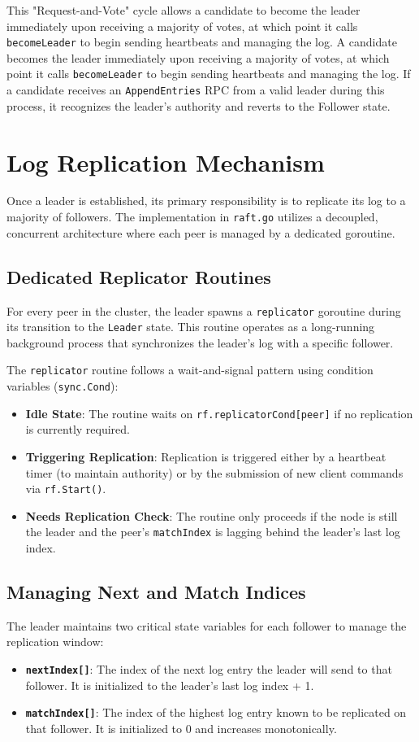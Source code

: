 This "Request-and-Vote" cycle allows a candidate to become the leader immediately upon receiving a majority of votes, at which point it calls \texttt{becomeLeader} to begin sending heartbeats and managing the log. A candidate becomes the leader immediately upon receiving a majority of votes, at which point it calls \texttt{becomeLeader} to begin sending heartbeats and managing the log. If a candidate receives an \texttt{AppendEntries} RPC from a valid leader during this process, it recognizes the leader's authority and reverts to the Follower state.

\section{Log Replication Mechanism}
\label{sec:log_replication_impl}
Once a leader is established, its primary responsibility is to replicate its log to a majority of followers. The implementation in \texttt{raft.go} utilizes a decoupled, concurrent architecture where each peer is managed by a dedicated goroutine.

\subsection{Dedicated Replicator Routines}
For every peer in the cluster, the leader spawns a \texttt{replicator} goroutine during its transition to the \texttt{Leader} state. This routine operates as a long-running background process that synchronizes the leader's log with a specific follower.

The \texttt{replicator} routine follows a wait-and-signal pattern using condition variables (\texttt{sync.Cond}):
\begin{itemize}
    \item \textbf{Idle State}: The routine waits on \texttt{rf.replicatorCond[peer]} if no replication is currently required.
    \item \textbf{Triggering Replication}: Replication is triggered either by a heartbeat timer (to maintain authority) or by the submission of new client commands via \texttt{rf.Start()}.
    \item \textbf{Needs Replication Check}: The routine only proceeds if the node is still the leader and the peer's \texttt{matchIndex} is lagging behind the leader's last log index.
\end{itemize}

\subsection{Managing Next and Match Indices}
The leader maintains two critical state variables for each follower to manage the replication window:
\begin{itemize}
    \item \textbf{\texttt{nextIndex[]}}: The index of the next log entry the leader will send to that follower. It is initialized to the leader's last log index + 1.
    \item \textbf{\texttt{matchIndex[]}}: The index of the highest log entry known to be replicated on that follower. It is initialized to 0 and increases monotonically.
\end{itemize}


